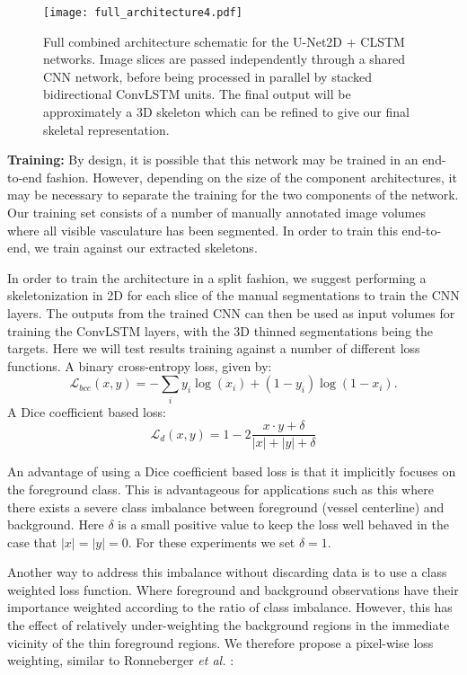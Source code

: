 \documentclass[journal,transmag]{IEEEtran}
\begin{document}
\begin{figure*}
\centering
\texttt{[image: full\_architecture4.pdf]}
\caption{Full combined architecture schematic for the U-Net2D + CLSTM networks. Image slices are passed independently through a shared CNN network, before being processed in parallel by stacked bidirectional ConvLSTM units. The final output will be approximately a 3D skeleton which can be refined to give our final skeletal representation. }
\label{fig:full_architecture}
\end{figure*}

\textbf{Training: } By design, it is possible that this network may be trained in an end-to-end fashion. However, depending on the size of the component architectures, it may be necessary to  separate the training for the two components of the network. Our training set consists of a number of manually annotated image volumes where all visible vasculature has been segmented. In order to train this end-to-end, we train against our extracted skeletons.

In order to train the architecture in a split fashion, we suggest performing a skeletonization in 2D for each slice of the manual segmentations to train the CNN layers. The outputs from the trained CNN can then be used as input volumes for training the ConvLSTM layers, with the 3D thinned segmentations being the targets. Here we will test results training against a number of different loss functions.
A binary cross-entropy loss, given by:
\begin{equation}
\mathcal{L}_{bce}(x,y) = -\sum_i{y_i \log(x_i) + (1-y_i) \log(1-x_i)}.
\label{eq:bce}
\end{equation}
A Dice coefficient based loss:
\begin{equation}
\mathcal{L}_{d}(x,y) = 1 - 2\frac{x \cdot y + \delta}{|x| + |y| + \delta}
\label{eq:dice}
\end{equation}

An advantage of using a Dice coefficient based loss is that it implicitly focuses on the foreground class. This is advantageous for applications such as this where there exists a severe class imbalance between foreground (vessel centerline) and background. Here $\delta$ is a small positive value to keep the loss well behaved in the case that $|x| = |y| = 0$. For these experiments we set $\delta = 1$.

Another way to address this imbalance without discarding data is to use a class weighted loss function. Where foreground and background observations have their importance weighted according to the ratio of class imbalance. However, this has the effect of relatively under-weighting the background regions in the immediate vicinity of the thin foreground regions. We therefore propose a pixel-wise loss weighting, similar to Ronneberger \emph{et al.} \cite{Ronneberger2015}:
\end{document}
